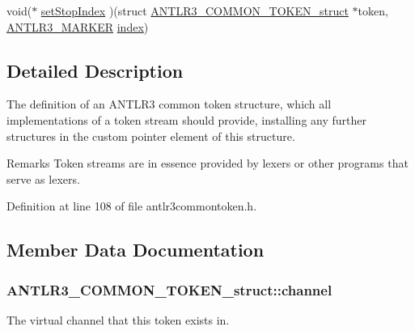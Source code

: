 \begin{DoxyCompactItemize}
\item 
void($\ast$ \hyperlink{struct_a_n_t_l_r3___c_o_m_m_o_n___t_o_k_e_n__struct_ab84aa965cc340ca0b51f31e02da4e80b}{set\-Stop\-Index} )(struct \hyperlink{struct_a_n_t_l_r3___c_o_m_m_o_n___t_o_k_e_n__struct}{A\-N\-T\-L\-R3\-\_\-\-C\-O\-M\-M\-O\-N\-\_\-\-T\-O\-K\-E\-N\-\_\-struct} $\ast$token, \hyperlink{antlr3defs_8h_a0361e6bf442e07afe923e4d05e9ebc4f}{A\-N\-T\-L\-R3\-\_\-\-M\-A\-R\-K\-E\-R} \hyperlink{struct_a_n_t_l_r3___c_o_m_m_o_n___t_o_k_e_n__struct_aa4e14f542df2d0c11835264d7bd8afe3}{index})
\end{DoxyCompactItemize}


\subsection{Detailed Description}
The definition of an A\-N\-T\-L\-R3 common token structure, which all implementations of a token stream should provide, installing any further structures in the custom pointer element of this structure.

\begin{DoxyRemark}{Remarks}
Token streams are in essence provided by lexers or other programs that serve as lexers. 
\end{DoxyRemark}


Definition at line 108 of file antlr3commontoken.\-h.



\subsection{Member Data Documentation}
\hypertarget{struct_a_n_t_l_r3___c_o_m_m_o_n___t_o_k_e_n__struct_af961ed91f161792bf4c6a621d3d8c097}{
\subsubsection[{channel}]{ A\-N\-T\-L\-R3\-\_\-\-C\-O\-M\-M\-O\-N\-\_\-\-T\-O\-K\-E\-N\-\_\-struct\-::channel}}\label{struct_a_n_t_l_r3___c_o_m_m_o_n___t_o_k_e_n__struct_af961ed91f161792bf4c6a621d3d8c097}
The virtual channel that this token exists in. 

